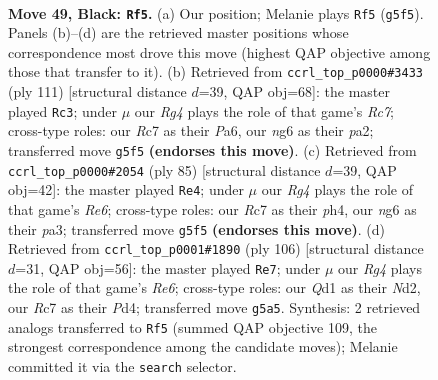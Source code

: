\documentclass[11pt]{article}
\begin{document}
\clearpage

\begin{figure}[p]\centering
\begin{subfigure}{0.46\textwidth}\centering
\resizebox{\linewidth}{!}{%
\newchessgame
\chessboard[
  setfen={6k1/2r3p1/1p4N1/6r1/P2pp3/6R1/5PK1/3q4 b - - 3 49},
  showmover=false,
  pgfstyle=straightmove, color=movearrow, markmove={g5-f5}
]}
\caption{}
\end{subfigure}\hfill
\begin{subfigure}{0.46\textwidth}\centering
\resizebox{\linewidth}{!}{%
\newchessgame
\chessboard[
  setfen={8/8/p4k2/5pp1/8/1P4PP/P1r1RK2/8 b - - 5 56},
  showmover=false,
  pgfstyle=straightmove, color=movearrow, markmove={c2-c3}
]}
\caption{}
\end{subfigure}
\\[4pt]
\begin{subfigure}{0.46\textwidth}\centering
\resizebox{\linewidth}{!}{%
\newchessgame
\chessboard[
  setfen={8/6k1/6p1/p6p/7P/P3rRK1/2P3P1/8 b - - 5 43},
  showmover=false,
  pgfstyle=straightmove, color=movearrow, markmove={e3-e4}
]}
\caption{}
\end{subfigure}\hfill
\begin{subfigure}{0.46\textwidth}\centering
\resizebox{\linewidth}{!}{%
\newchessgame
\chessboard[
  setfen={8/p7/3nRrk1/1P1P3p/3P2p1/6P1/3N2K1/8 w - - 7 54},
  showmover=false,
  pgfstyle=straightmove, color=movearrow, markmove={e6-e7}
]}
\caption{}
\end{subfigure}
\caption{\textbf{Move 49, Black: \texttt{Rf5}.} (a) Our position; Melanie plays \texttt{Rf5} (\texttt{g5f5}). Panels (b)--(d) are the retrieved master positions whose correspondence most drove this move (highest QAP objective among those that transfer to it). (b) Retrieved from \texttt{ccrl\_top\_p0000\#3433} (ply 111) [structural distance $d$=39, QAP obj=68]: the master played \texttt{Rc3}; under $\mu$ our \emph{Rg4} plays the role of that game's \emph{Rc7}; cross-type roles: our \emph{R}c7 as their \emph{P}a6, our \emph{n}g6 as their \emph{p}a2; transferred move \texttt{g5f5} \textbf{(endorses this move)}. (c) Retrieved from \texttt{ccrl\_top\_p0000\#2054} (ply 85) [structural distance $d$=39, QAP obj=42]: the master played \texttt{Re4}; under $\mu$ our \emph{Rg4} plays the role of that game's \emph{Re6}; cross-type roles: our \emph{R}c7 as their \emph{p}h4, our \emph{n}g6 as their \emph{p}a3; transferred move \texttt{g5f5} \textbf{(endorses this move)}. (d) Retrieved from \texttt{ccrl\_top\_p0001\#1890} (ply 106) [structural distance $d$=31, QAP obj=56]: the master played \texttt{Re7}; under $\mu$ our \emph{Rg4} plays the role of that game's \emph{Re6}; cross-type roles: our \emph{Q}d1 as their \emph{N}d2, our \emph{R}c7 as their \emph{P}d4; transferred move \texttt{g5a5}. Synthesis: 2 retrieved analogs transferred to \texttt{Rf5} (summed QAP objective 109, the strongest correspondence among the candidate moves); Melanie committed it via the \texttt{search} selector.}
\label{fig:thought-m97}
\end{figure}
\end{document}
